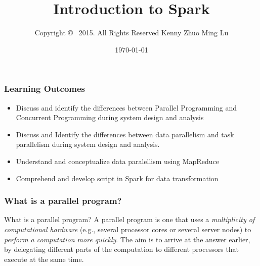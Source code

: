 \documentclass{beamer}
\newcommand{\beb}{\begin{exampleblock}}
\newcommand{\eeb}{\end{exampleblock}}
\newcommand{\redtxt}[1]{{\red #1}}
\begin{document}
\lstset{language=python}

\title{ Introduction to Spark} 
\author{ \white 
 Copyright \copyright~ 2015. All Rights Reserved
Kenny Zhuo Ming Lu 
}
\date{\today} 


%

\frame{\titlepage} 


\begin{frame}[fragile]
\frametitle{Learning Outcomes}

\begin{itemize}
 \item Discuss and identify the differences between Parallel Programming and Concurrent Programming during system design and analysis
 \item Discuss and Identify the differences between data parallelism
   and task parallelism during system design and analysis.
 \item Understand and conceptualize data paralellism using MapReduce
 \item Comprehend and develop script in Spark for data transformation
  
\end{itemize}
\end{frame}

\begin{frame}[fragile]
\frametitle{What is a parallel program?}

\beb{What is a parallel program?}
A parallel program is one that uses a {\em \redtxt{multiplicity of computational
hardware}} (e.g., several processor cores or several server nodes) to
{\em \redtxt{ perform a computation
more quickly}}. 
The aim is to arrive at the answer earlier, by
delegating different parts of the computation to different processors
that execute at the same time.
\eeb
\end{frame}
\end{document}
